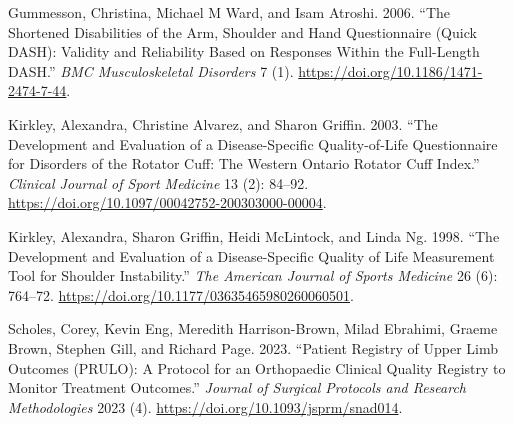 \documentclass[
]{article}
\newlength{\cslhangindent}
\newenvironment{CSLReferences}[2] %
 {\begin{list}{}{%
  \setlength{\itemindent}{0pt}
  \setlength{\leftmargin}{0pt}
  \setlength{\parsep}{0pt}
  \ifodd #1
   \setlength{\leftmargin}{\cslhangindent}
   \setlength{\itemindent}{-1\cslhangindent}
  \fi
  \setlength{\itemsep}{#2\baselineskip}}}
 {\end{list}}
\begin{document}
\label{refs}
\begin{CSLReferences}{1}{0}
Gummesson, Christina, Michael M Ward, and Isam Atroshi. 2006. {``The
Shortened Disabilities of the Arm, Shoulder and Hand Questionnaire
(Quick DASH): Validity and Reliability Based on Responses Within the
Full-Length DASH.''} \emph{BMC Musculoskeletal Disorders} 7 (1).
\url{https://doi.org/10.1186/1471-2474-7-44}.

Kirkley, Alexandra, Christine Alvarez, and Sharon Griffin. 2003. {``The
Development and Evaluation of a Disease-Specific Quality-of-Life
Questionnaire for Disorders of the Rotator Cuff: The Western Ontario
Rotator Cuff Index.''} \emph{Clinical Journal of Sport Medicine} 13 (2):
84--92. \url{https://doi.org/10.1097/00042752-200303000-00004}.

Kirkley, Alexandra, Sharon Griffin, Heidi McLintock, and Linda Ng. 1998.
{``The Development and Evaluation of a Disease-Specific Quality of Life
Measurement Tool for Shoulder Instability.''} \emph{The American Journal
of Sports Medicine} 26 (6): 764--72.
\url{https://doi.org/10.1177/03635465980260060501}.

Scholes, Corey, Kevin Eng, Meredith Harrison-Brown, Milad Ebrahimi,
Graeme Brown, Stephen Gill, and Richard Page. 2023. {``Patient Registry
of Upper Limb Outcomes (PRULO): A Protocol for an Orthopaedic Clinical
Quality Registry to Monitor Treatment Outcomes.''} \emph{Journal of
Surgical Protocols and Research Methodologies} 2023 (4).
\url{https://doi.org/10.1093/jsprm/snad014}.

\end{CSLReferences}
\end{document}
